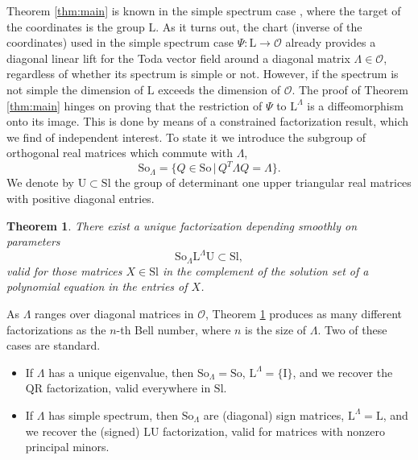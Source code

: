 \documentclass[reqno]{amsart}
\newcommand{\cO}{\mathcal{O}}
\newcommand{\Sl}{\mathrm{Sl}}
\newcommand{\So}{\mathrm{So}}
\renewcommand{\L}{\mathrm{L}}
\newcommand{\U}{\mathrm{U}}
\newtheorem{theorem}{Theorem}
\theoremstyle{definition} %
\begin{document}
\medskip
Theorem \ref{thm:main} is   known in the simple spectrum case \cite {LMST}, where the target of the coordinates is the group $\L$. As it turns out, the chart (inverse of the coordinates) used in the simple spectrum case $\Psi:\L\longrightarrow\cO$ already provides a diagonal linear lift for the Toda vector field around a diagonal matrix $\Lambda\in \cO$, regardless of whether its spectrum is simple or not. However, if the spectrum is not simple the dimension of $\L$ exceeds the dimension of $\cO$. The proof of Theorem \ref{thm:main} hinges on proving  that the restriction of $\Psi$ to $\L^\Lambda$ is a diffeomorphism onto its image. This is done by means of a constrained factorization result, which we find of independent interest.
To state it we introduce the subgroup of orthogonal real matrices which commute with $\Lambda$,
\[\So_\Lambda=\{Q\in \So\,|\, Q^T\Lambda Q=\Lambda\}.\]
 We denote by $\U\subset \Sl$ the group of determinant one upper triangular real matrices with positive diagonal entries.
\begin{theorem}\label{thm:constrained-QLU} There exist a unique factorization depending smoothly on parameters
 \[\So_\Lambda \L^\Lambda  \U\subset \Sl,\]
 valid for those matrices $X\in \Sl$ in the complement of the solution set of a polynomial equation in the entries of $X$.
\end{theorem}

 As $\Lambda$ ranges over diagonal matrices in $\cO$, Theorem \ref{thm:constrained-QLU} produces as many different factorizations as the $n$-th Bell number, where $n$ is the size of $\Lambda$.
Two of these cases are standard.
\begin{itemize}
 \item If $\Lambda$ has a unique eigenvalue, then $\So_\Lambda=\So$, $\L^\Lambda=\{\mathrm{I}\}$, and we recover the $\mathrm{QR}$ factorization, valid everywhere in $\Sl$.
 \item If $\Lambda$ has simple spectrum, then $\So_\Lambda$ are  (diagonal) sign matrices, $\L^\Lambda=\L$, and  we recover the (signed) $\L\U$ factorization, valid for matrices with nonzero principal minors.
\end{itemize}


\end{document}
